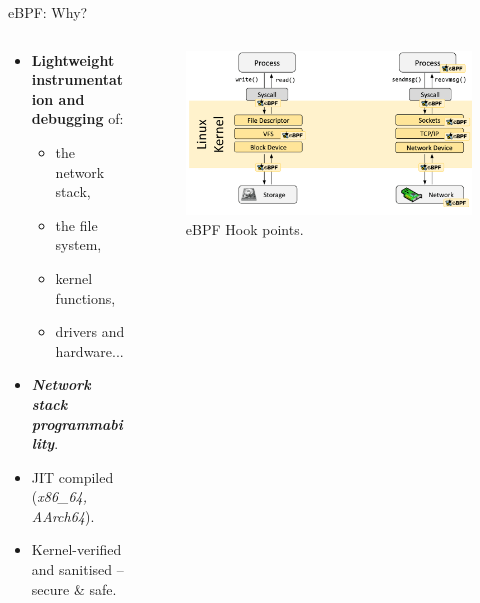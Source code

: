 \documentclass[aspectratio=169,xcolor={dvipsnames}
,handout %
]{beamer}
\begin{document}
\begin{frame}{eBPF: Why?}
	\begin{columns}
		\begin{column}{0.4\linewidth}
			\begin{itemize}[<+->]
				\item \alert{\textbf{Lightweight instrumentation and debugging}} of:
				\begin{itemize}
					\item the network stack,
					\item the file system,
					\item kernel functions,
					\item drivers and hardware...
				\end{itemize}
				\item \alert{\textbf{\emph{Network stack programmability}}}.
				\item \alert{JIT compiled} (\emph{x86\_64, AArch64}).
				\item Kernel-verified and sanitised -- \alert{secure \& safe}.
			\end{itemize}
		\end{column}
		\begin{column}{0.6\linewidth}
			\begin{figure}
				\centering
				\includegraphics[width=0.9\linewidth,keepaspectratio]{images/hook-overview}
				\caption{eBPF Hook points.}
			\end{figure}
		\end{column}
	\end{columns}
\end{frame}
\end{document}
